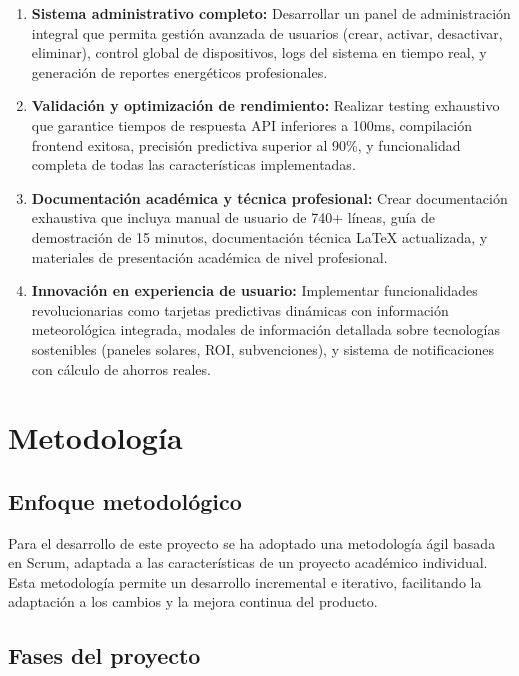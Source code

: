 \begin{enumerate}
    \item \textbf{Sistema administrativo completo:} Desarrollar un panel de administración integral que permita gestión avanzada de usuarios (crear, activar, desactivar, eliminar), control global de dispositivos, logs del sistema en tiempo real, y generación de reportes energéticos profesionales.
    
    \item \textbf{Validación y optimización de rendimiento:} Realizar testing exhaustivo que garantice tiempos de respuesta API inferiores a 100ms, compilación frontend exitosa, precisión predictiva superior al 90\%, y funcionalidad completa de todas las características implementadas.
    
    \item \textbf{Documentación académica y técnica profesional:} Crear documentación exhaustiva que incluya manual de usuario de 740+ líneas, guía de demostración de 15 minutos, documentación técnica LaTeX actualizada, y materiales de presentación académica de nivel profesional.
    
    \item \textbf{Innovación en experiencia de usuario:} Implementar funcionalidades revolucionarias como tarjetas predictivas dinámicas con información meteorológica integrada, modales de información detallada sobre tecnologías sostenibles (paneles solares, ROI, subvenciones), y sistema de notificaciones con cálculo de ahorros reales.
\end{enumerate}

\section{Metodología}

\subsection{Enfoque metodológico}

Para el desarrollo de este proyecto se ha adoptado una metodología ágil basada en Scrum, adaptada a las características de un proyecto académico individual. Esta metodología permite un desarrollo incremental e iterativo, facilitando la adaptación a los cambios y la mejora continua del producto.

\subsection{Fases del proyecto}

